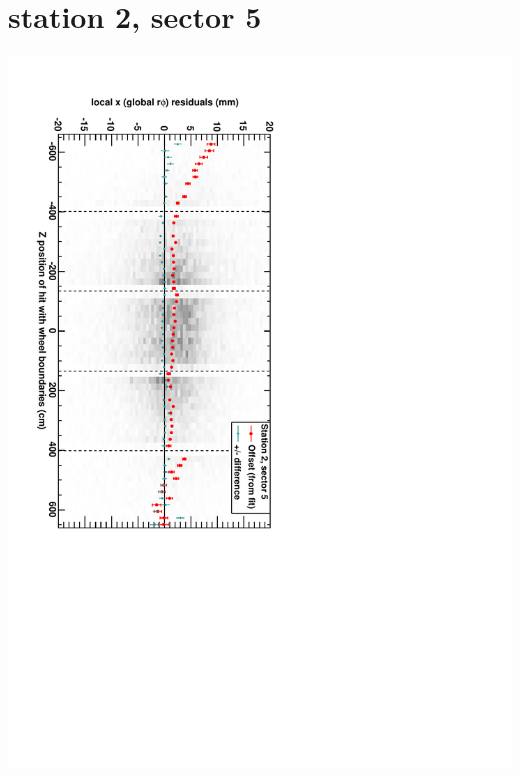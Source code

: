 \documentclass[compress]{beamer}
\begin{document}
\section*{station 2, sector 5}
\begin{frame} \vfill \mbox{\hspace{-1 cm}\includegraphics[height=1.2\linewidth, angle=90]{DTrphiVsZ_st2_sr05.pdf}} \end{frame}
\end{document}
